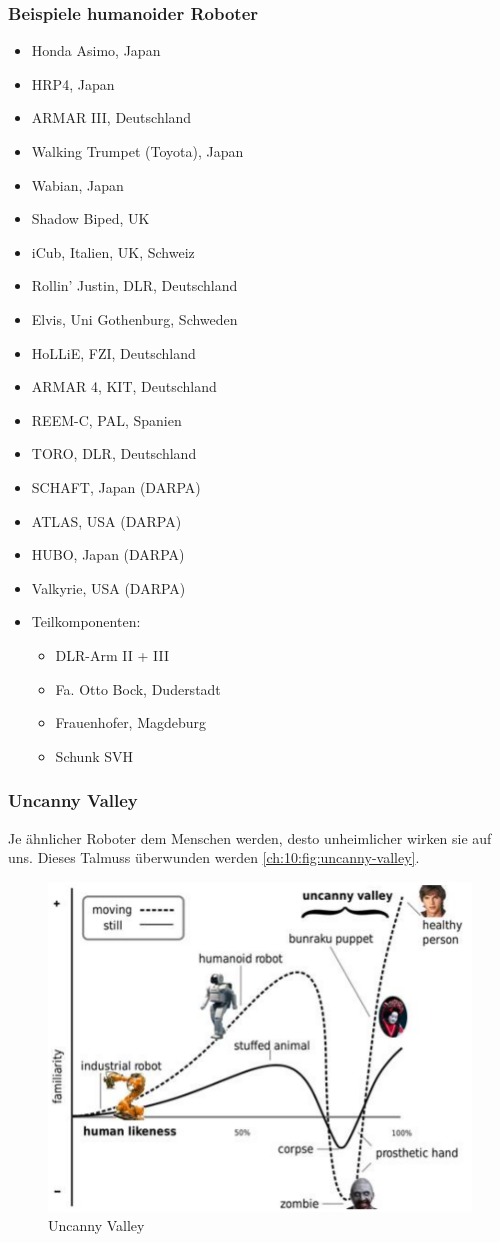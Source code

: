 \subsubsection{Beispiele humanoider Roboter}
\begin{itemize}
	\item Honda Asimo, Japan
	\item HRP4, Japan
	\item ARMAR III, Deutschland
	\item Walking Trumpet (Toyota), Japan
	\item Wabian, Japan
	\item Shadow Biped, UK
	\item iCub, Italien, UK, Schweiz
	\item Rollin' Justin, DLR, Deutschland
	\item Elvis, Uni Gothenburg, Schweden
	\item HoLLiE, FZI, Deutschland
	\item ARMAR 4, KIT, Deutschland
	\item REEM-C, PAL, Spanien
	\item TORO, DLR, Deutschland
	\item SCHAFT, Japan (DARPA)
	\item ATLAS, USA (DARPA)
	\item HUBO, Japan (DARPA)
	\item Valkyrie, USA (DARPA)
	\item Teilkomponenten:
	\begin{itemize}
		\item DLR-Arm II + III
		\item Fa. Otto Bock, Duderstadt
		\item Frauenhofer, Magdeburg
		\item Schunk SVH
	\end{itemize}
\end{itemize}

\subsubsection{Uncanny Valley}
Je ähnlicher Roboter dem Menschen werden, desto unheimlicher wirken sie auf uns.
Dieses \glqq Tal\grqq  muss überwunden werden \autoref{ch:10:fig:uncanny-valley}.
\begin{figure}
	\centering
	\includegraphics[width=.5\textwidth]{figures/uncanny_valley.png}
	\caption{Uncanny Valley}
	\label{ch:10:fig:uncanny-valley}
\end{figure}

